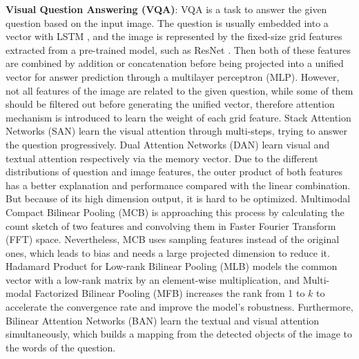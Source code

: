 \documentclass[10pt,twocolumn,letterpaper]{article}
\begin{document}
\textbf{Visual Question Answering (VQA)}: VQA is a task to answer the given question based on the input image. The question is usually embedded into a vector with LSTM \cite{hochreiter1997long}, and the image is represented by the fixed-size grid features extracted from a pre-trained model, such as ResNet \cite{he2016deep}. Then both of these features are combined by addition or concatenation \cite{antol2015vqa} before being projected into a unified vector for answer prediction through a multilayer perceptron (MLP). However, not all features of the image are related to the given question, while some of them should be filtered out before generating the unified vector, therefore attention mechanism is introduced to learn the weight of each grid feature. Stack Attention Networks (SAN) \cite{yang2016stacked} learn the visual attention through multi-steps, trying to answer the question progressively. Dual Attention Networks (DAN) \cite{nam2016dual} learn visual and textual attention respectively via the memory vector. Due to the different distributions of question and image features, the outer product of both features has a better explanation and performance compared with the linear combination. But because of its high dimension output, it is hard to be optimized. Multimodal Compact Bilinear Pooling (MCB) \cite{fukui2016multimodal} is approaching this process by calculating the count sketch of two features and convolving them in Faster Fourier Transform (FFT) space. Nevertheless, MCB uses sampling features instead of the original ones, which leads to bias and needs a large projected dimension to reduce it. Hadamard Product for Low-rank Bilinear Pooling (MLB) \cite{kim2016hadamard} models the common vector with a low-rank matrix by an element-wise multiplication, and Multi-modal Factorized Bilinear Pooling (MFB) \cite{yu2017mfb} increases the rank from 1 to $k$ to accelerate the convergence rate and improve the model's robustness. Furthermore, Bilinear Attention Networks (BAN) \cite{kim2018bilinear} learn the textual and visual attention simultaneously, which builds a mapping from the detected objects of the image to the words of the question.
\end{document}
